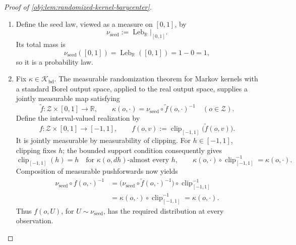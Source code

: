 \documentclass[11pt]{article}
\begin{document}
\begin{proof}[Proof of \cref{obj:lem:randomized-kernel-barycenter}]
\begin{enumerate}
For the conversion to a real value, use
\[
\operatorname{rv}:[0,\infty]\to\mathbb R,
\qquad
\operatorname{rv}|_{[0,\infty)}=\operatorname{id},
\qquad
\operatorname{rv}(\infty)=0.
\]
The bounds \(0\le\mathcal R_{\mathrm{bd}}\le4\) place every bounded-kernel
supremum, and their infimum, in \([0,4]\). On this interval the real and
extended orders agree, so conversion commutes with these suprema and the
infimum. For an empty parameter set both kinds of supremum equal zero.
It follows that
\[
\operatorname{rv}\!\left(
\inf_{\kappa\in\mathcal K_{\mathrm{real}}}
\sup_{\lambda\in\Lambda}\mathcal R_{\mathrm{ext}}(\kappa,\lambda)
\right)
=
\inf_{\kappa\in\mathcal K_{\mathrm{bd}}}
\sup_{\lambda\in\Lambda}\mathcal R_{\mathrm{bd}}(\kappa,\lambda),
\]
where the right side is now evaluated in \(\mathbb R\). %

\item Define the seed law, viewed as a measure on \([0,1]\), by
\[
\nu_{\mathrm{seed}}
:=\left.\operatorname{Leb}_{\mathbb R}\right|_{[0,1]}.
\]
Its total mass is
\[
\nu_{\mathrm{seed}}([0,1])
=\operatorname{Leb}_{\mathbb R}([0,1])
=1-0=1,
\]
so it is a probability law. %

\item Fix \(\kappa\in\mathcal K_{\mathrm{bd}}\). The measurable randomization
theorem for Markov kernels with a standard Borel output space, applied to the
real output space, supplies a jointly measurable map satisfying
\[
\widetilde f:\mathcal Z\times[0,1]\to\mathbb R,
\qquad
\kappa(o,\cdot)
=
\nu_{\mathrm{seed}}\circ\widetilde f(o,\cdot)^{-1}
\quad(o\in\mathcal Z).
\]
Define the interval-valued realization by
\[
f:\mathcal Z\times[0,1]\to[-1,1],
\qquad
f(o,v):=\operatorname{clip}_{[-1,1]}\bigl(\widetilde f(o,v)\bigr).
\]
It is jointly measurable by measurability of clipping. For
\(h\in[-1,1]\), clipping fixes \(h\); the bounded support condition consequently
gives
\[
\operatorname{clip}_{[-1,1]}(h)=h
\quad\text{for }\kappa(o,dh)\text{-almost every }h,
\qquad
\kappa(o,\cdot)\circ\operatorname{clip}_{[-1,1]}^{-1}
=\kappa(o,\cdot).
\]
Composition of measurable pushforwards now yields
\[
\begin{aligned}
\nu_{\mathrm{seed}}\circ f(o,\cdot)^{-1}
&=
\bigl(\nu_{\mathrm{seed}}\circ\widetilde f(o,\cdot)^{-1}\bigr)
\circ\operatorname{clip}_{[-1,1]}^{-1}\\
&=\kappa(o,\cdot)\circ\operatorname{clip}_{[-1,1]}^{-1}
=\kappa(o,\cdot).
\end{aligned}
\]
Thus \(f(o,U)\), for \(U\sim\nu_{\mathrm{seed}}\), has the required distribution
at every observation. %


\end{enumerate}
\end{proof}
\end{document}
